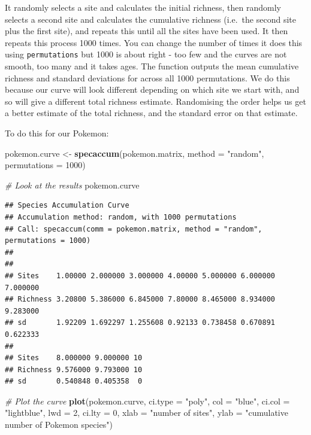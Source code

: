 \documentclass[]{book}
\newenvironment{Shaded}{\begin{snugshade}}{\end{snugshade}}
\newcommand{\KeywordTok}[1]{\textcolor[rgb]{0.13,0.29,0.53}{\textbf{{#1}}}}
\newcommand{\DataTypeTok}[1]{\textcolor[rgb]{0.13,0.29,0.53}{{#1}}}
\newcommand{\DecValTok}[1]{\textcolor[rgb]{0.00,0.00,0.81}{{#1}}}
\newcommand{\StringTok}[1]{\textcolor[rgb]{0.31,0.60,0.02}{{#1}}}
\newcommand{\CommentTok}[1]{\textcolor[rgb]{0.56,0.35,0.01}{\textit{{#1}}}}
\newcommand{\NormalTok}[1]{{#1}}
\begin{document}
It randomly selects a site and calculates the initial richness, then
randomly selects a second site and calculates the cumulative richness
(i.e.~the second site plus the first site), and repeats this until all
the sites have been used. It then repeats this process 1000 times. You
can change the number of times it does this using \texttt{permutations}
but 1000 is about right - too few and the curves are not smooth, too
many and it takes ages. The function outputs the mean cumulative
richness and standard deviations for across all 1000 permutations. We do
this because our curve will look different depending on which site we
start with, and so will give a different total richness estimate.
Randomising the order helps us get a better estimate of the total
richness, and the standard error on that estimate.

To do this for our Pokemon:

\begin{Shaded}
\begin{Highlighting}[]
\NormalTok{pokemon.curve <-}\StringTok{ }\KeywordTok{specaccum}\NormalTok{(pokemon.matrix, }\DataTypeTok{method =} \StringTok{"random"}\NormalTok{, }\DataTypeTok{permutations =} \DecValTok{1000}\NormalTok{)}

\CommentTok{# Look at the results}
\NormalTok{pokemon.curve}
\end{Highlighting}
\end{Shaded}

\begin{verbatim}
## Species Accumulation Curve
## Accumulation method: random, with 1000 permutations
## Call: specaccum(comm = pokemon.matrix, method = "random", permutations = 1000) 
## 
##                                                                      
## Sites    1.00000 2.000000 3.000000 4.00000 5.000000 6.000000 7.000000
## Richness 3.20800 5.386000 6.845000 7.80000 8.465000 8.934000 9.283000
## sd       1.92209 1.692297 1.255608 0.92133 0.738458 0.670891 0.622333
##                              
## Sites    8.000000 9.000000 10
## Richness 9.576000 9.793000 10
## sd       0.540848 0.405358  0
\end{verbatim}

\begin{Shaded}
\begin{Highlighting}[]
\CommentTok{# Plot the curve}
\KeywordTok{plot}\NormalTok{(pokemon.curve, }\DataTypeTok{ci.type =} \StringTok{"poly"}\NormalTok{, }\DataTypeTok{col =} \StringTok{"blue"}\NormalTok{, }\DataTypeTok{ci.col =} \StringTok{"lightblue"}\NormalTok{, }
     \DataTypeTok{lwd =} \DecValTok{2}\NormalTok{, }\DataTypeTok{ci.lty =} \DecValTok{0}\NormalTok{, }\DataTypeTok{xlab =} \StringTok{"number of sites"}\NormalTok{, }
     \DataTypeTok{ylab =} \StringTok{"cumulative number of Pokemon species"}\NormalTok{)}
\end{Highlighting}
\end{Shaded}
\end{document}
